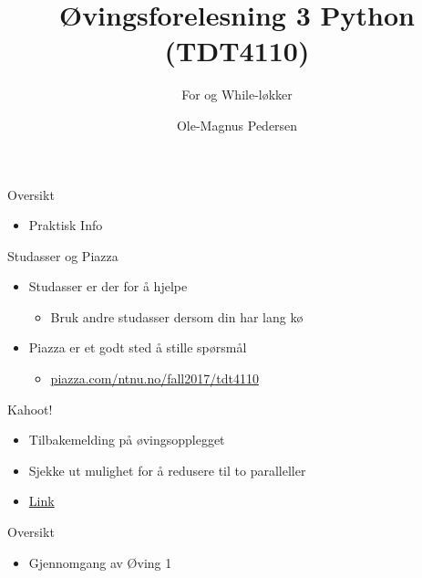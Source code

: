 \documentclass[screen, aspectratio=169]{beamer}
\title[Short title]{Øvingsforelesning 3 Python (TDT4110)}
\subtitle{For og While-løkker}
\author[O.M. Pedersen]{Ole-Magnus Pedersen}
\institute[NTNU]{}
\date{}
\begin{document}
\begin{frame}
  \titlepage
\end{frame}


\begin{frame}{Oversikt}
	\begin{itemize}
		\item Praktisk Info
	\end{itemize}
\end{frame}

\begin{frame}{Studasser og Piazza}
	\begin{itemize}
		\item Studasser er der for å hjelpe
		\begin{itemize}
			\item Bruk andre studasser dersom din har lang kø
		\end{itemize}
		\vspace{1em}
		\item Piazza er et godt sted å stille spørsmål
		\begin{itemize}
			\item \href{piazza.com/ntnu.no/fall2017/tdt4110}{piazza.com/ntnu.no/fall2017/tdt4110}
		\end{itemize}
	\end{itemize}
\end{frame}

\begin{frame}[fragile]{Kahoot!}
	\begin{itemize}
		\item Tilbakemelding på øvingsopplegget
		\item Sjekke ut mulighet for å redusere til to paralleller
		\tiny \item \href{https://play.kahoot.it/#/k/09d6073f-6747-4f20-ac5d-ffdd2bbb8911}{Link}
	\end{itemize}
\end{frame}

\begin{frame}{Oversikt}
	\begin{itemize}
		\item Gjennomgang av Øving 1
	\end{itemize}
\end{frame}
\end{document}
